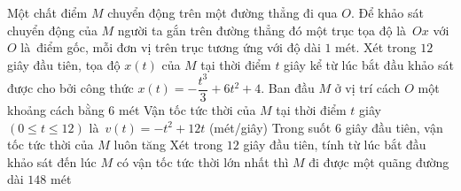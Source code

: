 \begin{ex}%
	Một chất điểm $M$ chuyển động trên một đường thẳng đi qua $O$. Để khảo sát chuyển động của $M$ người ta gắn trên đường thẳng đó một trục tọa độ  là~$Ox$ với $O$ là~điểm gốc, mỗi đơn vị trên trục tương ứng với độ dài $1$ mét. Xét trong $12$ giây đầu tiên, tọa độ $x(t)$ của $M$ tại thời điểm $t$ giây kể từ lúc bắt đầu khảo sát được cho bởi công thức $x(t)=-\dfrac{t^3}{3}+6t^2+4$.
	 \choiceTF
		{Ban  đầu $M$ ở vị trí cách $O$ một khoảng cách bằng $6$ mét}
		{\True Vận tốc tức thời của $M$ tại thời điểm  $t$ giây $(0 \leq t \leq 12)$ là~$v(t)=-t^2+12t$ (mét/giây)}
		{\True Trong suốt $6$ giây đầu tiên, vận tốc tức thời của  $M$ luôn tăng}
		{\True Xét trong $12$ giây đầu tiên, tính từ lúc bắt đầu khảo  sát đến lúc $M$ có vận tốc tức thời lớn nhất thì $M$ đi được một quãng đường dài $148$ mét}
\end{ex}

